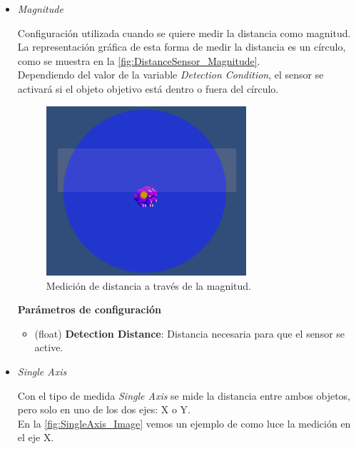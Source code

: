 \begin{itemize}
	\item \textit{Magnitude}

Configuración utilizada cuando se quiere medir la distancia como magnitud. La representación gráfica de esta forma de medir la distancia es un círculo, como se muestra en la \autoref{fig:DistanceSensor_Magnitude}.\\
Dependiendo del valor de la variable \textit{Detection Condition}, el sensor se activará si el objeto objetivo está dentro o fuera del círculo.
\begin{figure}[t]
	\centering
	\includegraphics[width = 0.7\textwidth]{Imagenes/DistanceSensorMagnitude.png}
	\caption{Medición de distancia a través de la magnitud.}
	\label{fig:DistanceSensor_Magnitude}
\end{figure}

\textbf{Parámetros de configuración}
	\begin{itemize}
	        \item (float) \textbf{Detection Distance}: Distancia necesaria para que el sensor se active.
	 \end{itemize}

	\item \textit{Single Axis}

Con el tipo de medida \textit{Single Axis} se mide la distancia entre ambos objetos, pero solo en uno de los dos ejes: X o Y.\\
En la \autoref{fig:SingleAxis_Image} vemos un ejemplo de como luce la medición en el eje X.\\


\end{itemize}
